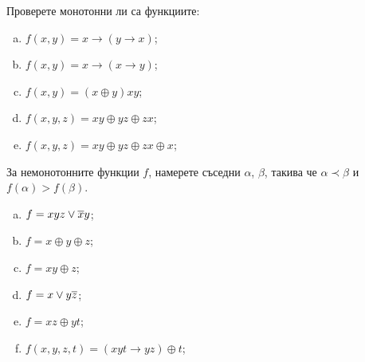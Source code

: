 \begin{problem}
  Проверете монотонни ли са функциите:
  \begin{enumerate}[a)]
  \item
    $f(x,y) = x\rightarrow (y\rightarrow x)$;
  \item
    $f(x,y) = x\rightarrow (x\rightarrow y)$;
  \item
    $f(x,y) = (x\oplus y)xy$;
  \item
    $f(x,y,z) = xy\oplus yz \oplus zx$;
  \item
    $f(x,y,z) = xy\oplus yz \oplus zx \oplus x$;
  \end{enumerate}
\end{problem}

\begin{problem}
  За немонотонните функции $f$, намерете съседни $\alpha$, $\beta$, такива че
  $\alpha \prec \beta$ и $f(\alpha) > f(\beta)$.
  \begin{enumerate}[a)]
  \item
    $f = xyz \vee \overline{x}y$;
  \item
    $f = x\oplus y\oplus z$;
  \item
    $f = xy\oplus z$;
  \item
    $f = x\vee y\overline{z}$;
  \item
    $f = xz\oplus yt$;
  \item
    $f(x,y,z,t) = (xyt\rightarrow yz)\oplus t$;
  \end{enumerate}
\end{problem}


